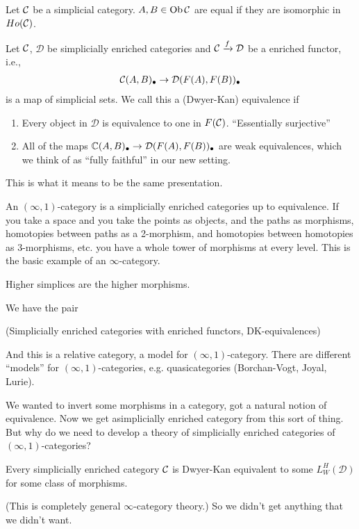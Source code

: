 \documentclass[../MH_Total.tex]{subfiles}
\begin{document}
\begin{definition}
	Let $\mathcal{C}$ be a simplicial category. $A,B \in \operatorname{Ob}\mathcal{C}$ are equal if they are isomorphic in $Ho(\mathcal{C})$. 
\end{definition}

\begin{definition}
	Let $\mathcal{C}$, $\mathcal{D}$ be simplicially enriched categories and $\mathcal{C} \xrightarrow{f} \mathcal{D}$ be a enriched functor, i.e., 
	\begin{align*}
		\mathcal{C}(A,B)_\bullet \to \mathcal{D}(F(A),F(B))_\bullet
	\end{align*}
	is a map of simplicial sets. We call this a (Dwyer-Kan) equivalence if 
	\begin{enumerate}
		\item Every object in $\mathcal{D}$ is equivalence to one in $F(\mathcal{C})$. ``Essentially surjective''
		\item All of the maps $\mathbb{C}(A,B)_\bullet \to \mathcal{D}(F(A),F(B))_\bullet$ are weak equivalences, which we think of as ``fully faithful'' in our new setting. 
	\end{enumerate}
\end{definition}
This is what it means to be the same presentation. 

An $(\infty,1)$-category is a simplicially enriched categories up to equivalence. If you take a space and you take the points as objects, and the paths as morphisms, homotopies between paths as a 2-morphism, and homotopies between homotopies as 3-morphisms, etc. you have a whole tower of morphisms at every level. This is the basic example of an $\infty$-category. 

Higher simplices are the higher morphisms.

We have the pair

(Simplicially enriched categories with enriched functors, DK-equivalences)

And this is a relative category, a model for $(\infty,1)$-category. There are different ``models'' for $(\infty,1)$-categories, e.g. quasicategories (Borchan-Vogt, Joyal, Lurie). 

We wanted to invert some morphisms in a category, got a natural notion of equivalence. Now we get asimplicially enriched category from this sort of thing. But why do we need to develop a theory of simplicially enriched categories of $(\infty,1)$-categories?
\begin{theorem}
	Every simplicially enriched category $\mathcal{C}$ is Dwyer-Kan equivalent to some $L_W^H(\mathcal{D})$ for some class of morphisms. 
\end{theorem}
(This is completely general $\infty$-category theory.) So we didn't get anything that we didn't want.
\end{document}
